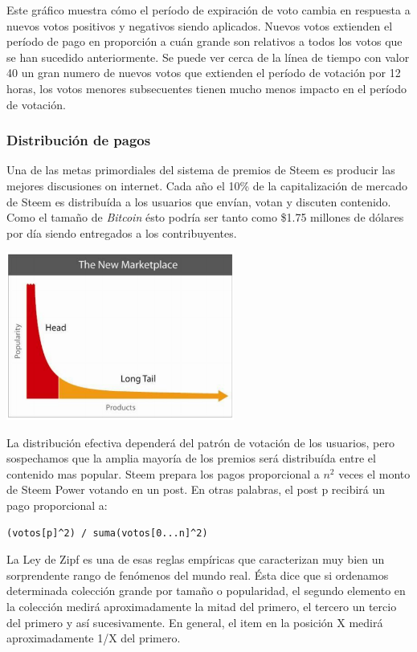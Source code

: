 \documentclass[a4paper,titlepage,final]{article}
\begin{document}
Este gráfico muestra cómo el período de expiración de voto cambia en respuesta a nuevos votos positivos y negativos siendo aplicados. Nuevos votos extienden el período de pago en proporción a cuán grande son relativos a todos los votos que se han sucedido anteriormente. Se puede ver cerca de la línea de tiempo con valor 40 un gran numero de nuevos votos que extienden el período de votación por 12 horas, los votos menores subsecuentes tienen mucho menos impacto en el período de votación.

\subsubsection{Distribución de pagos}

Una de las metas primordiales del sistema de premios de Steem es producir las mejores discusiones on internet. Cada año el 10\% de la capitalización de mercado de Steem es distribuída a los usuarios que envían, votan y discuten contenido. Como el tamaño de \textit{Bitcoin} ésto podría ser tanto como \$1.75 millones de dólares por día siendo entregados a los contribuyentes.

\begin{center}
\includegraphics[width=7.5cm]{fig/fig3}
\end{center}

La distribución efectiva dependerá del patrón de votación de los usuarios, pero sospechamos que la amplia mayoría de los premios será distribuída entre el contenido mas popular. Steem prepara los pagos proporcional a \textit{$n^2$} veces el monto de Steem Power votando en un post. En otras palabras, el post p recibirá un pago proporcional a:

\begin{lstlisting}[frame=single]
(votos[p]^2) / suma(votos[0...n]^2)
\end{lstlisting}

La Ley de Zipf\cite{7} es una de esas reglas empíricas que caracterizan muy bien un sorprendente rango de fenómenos del mundo real. Ésta dice que si ordenamos determinada colección grande por tamaño o popularidad, el segundo elemento en la colección medirá aproximadamente la mitad del primero, el tercero un tercio del primero y así sucesivamente. En general, el item en la posición X medirá aproximadamente 1/X del primero.
\end{document}
